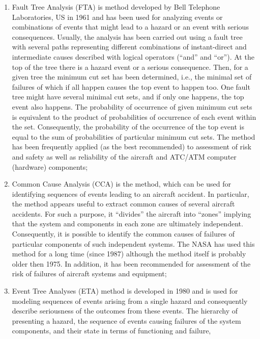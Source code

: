 \documentclass[a4paper, 10pt]{article}
\begin{document}
\begin{enumerate}
		\item Fault Tree Analysis (FTA) is method developed by
				Bell Telephone Laboratories, US in 1961 and has been used
				for analyzing events or combinations of events that might lead
				to a hazard or an event with serious consequences. Usually, the
				analysis has been carried out using a fault tree with several
				paths representing different combinations of instant-direct and
				intermediate causes described with logical operators (“and” and
				“or”). At the top of the tree there is a hazard event or a serious
				consequence. Then, for a given tree the minimum cut set has
				been determined, i.e., the minimal set of failures of which if all
				happen causes the top event to happen too. One fault tree might
				have several minimal cut sets, and if only one happens, the top
				event also happens. The probability of occurrence of given
				minimum cut sets is equivalent to the product of probabilities
				of occurrence of each event within the set. Consequently, the
				probability of the occurrence of the top event is equal to the
				sum of probabilities of particular minimum cut sets. The
				method has been frequently applied (as the best recommended)
				to assessment of risk and safety as well as reliability of the
				aircraft and ATC/ATM computer (hardware) components;
		\item Common Cause Analysis (CCA) is the method, which
				can be used for identifying sequences of events leading to an
				aircraft accident. In particular, the method appears useful to
				extract common causes of several aircraft accidents. For such a
				purpose, it “divides” the aircraft into “zones” implying that the
				system and components in each zone are ultimately
				independent. Consequently, it is possible to identify the
				common causes of failures of particular components of such
				independent systems. The NASA has used this method for a
				long time (since 1987) although the method itself is probably
				older then 1975. In addition, it has been recommended for
				assessment of the risk of failures of aircraft systems and
				equipment;
		\item Event Tree Analyses (ETA) method is developed in
				1980 and is used for modeling sequences of events arising from
				a single hazard and consequently describe seriousness of the
				outcomes from these events. The hierarchy of presenting a
				hazard, the sequence of events causing failures of the system
				components, and their state in terms of functioning and failure,

\end{enumerate}
\end{document}
